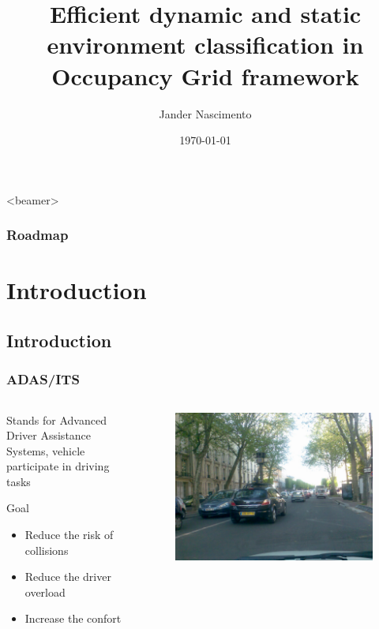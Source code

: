 \documentclass{beamer}
\title[Fast classification]{Efficient dynamic and static environment classification in Occupancy Grid framework}
\author{Jander Nascimento}
\institute{Université Joseph Fourier / INRIA}
\date{\today}
\begin{document}
\begin{frame}
\titlepage
\end{frame}

{
  \begin{frame}<beamer>
    \frametitle{Roadmap}
    \tableofcontents%
  \end{frame}
}

	\section{Introduction}
	
\subsection*{Introduction}	

	\begin{frame}
		\frametitle{ADAS/ITS}
		
		\begin{columns}[t]
		  \begin{column}{5cm}
			\begin{exampleblock}{Stands for}	
				Advanced Driver Assistance Systems, vehicle participate in driving tasks

			\end{exampleblock}		
			\begin{block}{Goal}
				\begin{itemize}
				\item Reduce the risk of collisions
				\item Reduce the driver overload
				\item Increase the confort
				\end{itemize}
			\end{block}
		  \end{column}
		  
		  \begin{column}{5cm}
		  \begin{figure}[h]
			\center
			\includegraphics[scale=0.15]{img/fig:street:urban}
		  \end{figure}   
		  \end{column}
		 \end{columns}

	\end{frame}	
\end{document}
